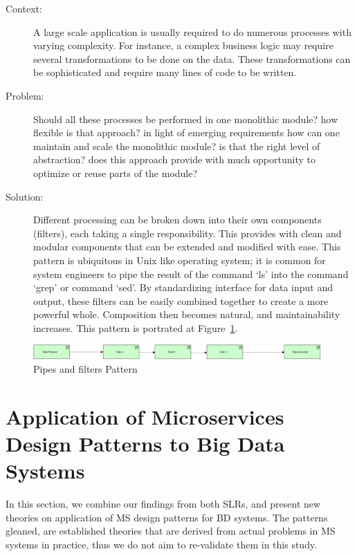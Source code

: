 \documentclass{bmcart}
\begin{document}
\begin{description}
  \item[Context:] A large scale application is usually required to do numerous processes with varying complexity. For instance, a complex business logic may require several transformations to be done on the data. These transformations can be sophisticated and require many lines of code to be written.
  \item[Problem:] Should all these processes be performed in one monolithic module? how flexible is that approach? in light of emerging requirements how can one maintain and scale the monolithic module? is that the right level of abstraction? does this approach provide with much opportunity to optimize or reuse parts of the module? 
  \item[Solution:] Different processing can be broken down into their own components (filters), each taking a single responsibility. This provides with clean and modular components that can be extended and modified with ease. This pattern is ubiquitous in Unix like operating system; it is common for system engineers to pipe the result of the command `ls' into the command `grep' or command `sed'. By standardizing interface for data input and output, these filters can be easily combined together to create a more powerful whole. Composition then becomes natural, and maintainability increases. This pattern is portrated at Figure~\ref{PipesAndFilters}.   
\end{description}


\begin{figure}[h]
  \includegraphics[width=11cm]{Media/Pipes and Filters.jpg}
  \caption{Pipes and filters Pattern}
  \label{PipesAndFilters}
\end{figure}

\section{Application of Microservices Design Patterns to Big Data Systems} \label{Mapping}


In this section, we combine our findings from both SLRs, and present new theories on application of MS design patterns for BD systems. The patterns gleaned, are established theories that are derived from actual problems in MS systems in practice, thus we do not aim to re-validate them in this study. 
\end{document}
